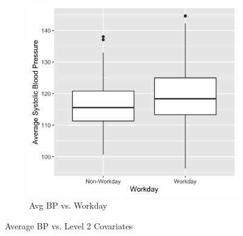 \documentclass[12pt,twoside,letterpaper]{article}
\theoremstyle{definition}
\theoremstyle{definition}
\begin{document}
\begin{figure}
\begin{subfigure}{0.48\textwidth}
        \includegraphics[width=\textwidth]{pics/bp v day.png}
        \caption{{\small Avg BP vs. Workday}}
        \label{fig: bp v day}
    \end{subfigure}
    \caption{{\small Average BP vs. Level 2 Covariates}}
    \label{fig: bp v level2}
\end{figure}
\end{document}
